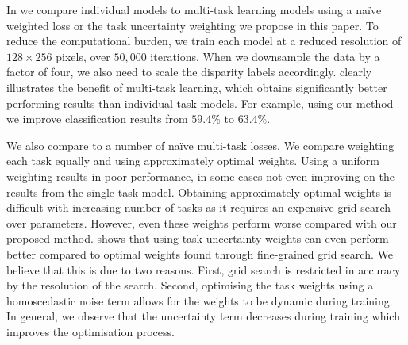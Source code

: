 In  we compare individual models to multi-task learning models using a na{\"i}ve weighted loss or the task uncertainty weighting we propose in this paper. To reduce the computational burden, we train each model at a reduced resolution of $128\times256$ pixels, over $50,000$ iterations. When we downsample the data by a factor of four, we also need to scale the disparity labels accordingly.  clearly illustrates the benefit of multi-task learning, which obtains significantly better performing results than individual task models. For example, using our method we improve classification results from $59.4\%$ to $63.4\%$.

We also compare to a number of na{\"i}ve multi-task losses. We compare weighting each task equally and using approximately optimal weights. Using a uniform weighting results in poor performance, in some cases not even improving on the results from the single task model. Obtaining approximately optimal weights is difficult with increasing number of tasks as it requires an expensive grid search over parameters. However, even these weights perform worse compared with our proposed method.  shows that using task uncertainty weights can even perform better compared to optimal weights found through fine-grained grid search. We believe that this is due to two reasons. First, grid search is restricted in accuracy by the resolution of the search. Second, optimising the task weights using a homoscedastic noise term allows for the weights to be dynamic during training. In general, we observe that the uncertainty term decreases during training which improves the optimisation process.


